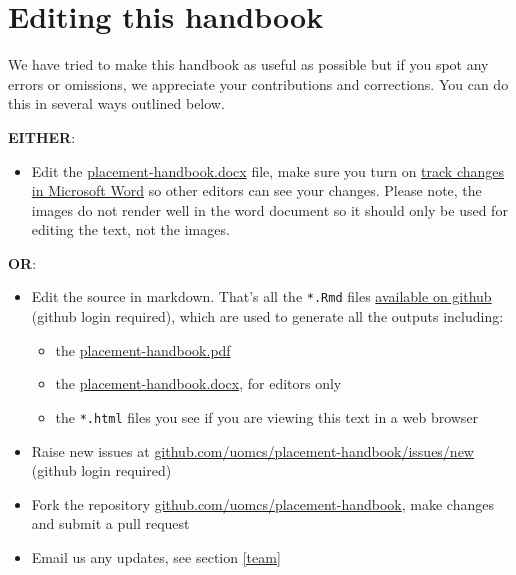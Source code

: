 \documentclass[
]{book}
\providecommand{\tightlist}{%
  \setlength{\itemsep}{0pt}\setlength{\parskip}{0pt}}
\begin{document}
\section{Editing this handbook}\label{edit}

We have tried to make this handbook as useful as possible but if you spot any errors or omissions, we appreciate your contributions and corrections. You can do this in several ways outlined below.

\textbf{EITHER}:

\begin{itemize}
\tightlist
\item
  Edit the \url{placement-handbook.docx} file, make sure you turn on \href{https://support.microsoft.com/en-gb/office/track-changes-in-word-197ba630-0f5f-4a8e-9a77-3712475e806a}{track changes in Microsoft Word} so other editors can see your changes. Please note, the images do not render well in the word document so it should only be used for editing the text, not the images.
\end{itemize}

\textbf{OR}:

\begin{itemize}
\tightlist
\item
  Edit the source in markdown. That's all the \texttt{*.Rmd} files \href{https://github.com/search?q=repo\%3AUoMCS\%2Fplacement-handbook++language\%3ARMarkdown&type=code}{available on github} (github login required), which are used to generate all the outputs including:

  \begin{itemize}
  \tightlist
  \item
    the \url{placement-handbook.pdf}
  \item
    the \url{placement-handbook.docx}, for editors only
  \item
    the \texttt{*.html} files you see if you are viewing this text in a web browser
  \end{itemize}
\item
  Raise new issues at \href{https://github.com/uomcs/placement-handbook/issues/new}{github.com/uomcs/placement-handbook/issues/new} (github login required)
\item
  Fork the repository \href{https://github.com/uomcs/placement-handbook}{github.com/uomcs/placement-handbook}, make changes and submit a pull request
\item
  Email us any updates, see section \ref{team}
\end{itemize}
\end{document}
